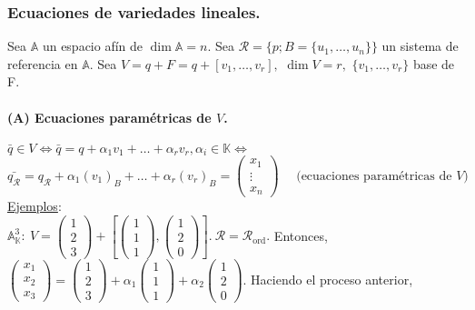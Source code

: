 \documentclass[11pt]{article}
\newcommand{\af}{\mathbb{A}}
\newcommand{\ej}{\underline{Ejemplos}:\\}
\begin{document}
\subsubsection{Ecuaciones de variedades lineales.}
Sea $\af$ un espacio afín de $\dim\af=n$. Sea $\mathcal{R}=\{p;B=\{u_1,\ldots,u_n\}\}$ un sistema de referencia en $\af$. Sea $V=q+F=q+[v_1,\ldots,v_r],$ $\dim V=r,$ $\{v_1,\ldots,v_r\}$ base de F.
\paragraph{(A) Ecuaciones paramétricas de $V$.}
$\bar{q}\in V\iff \bar{q}=q+\alpha_1v_1+\ldots+\alpha_rv_r,\alpha_i\in\mathbb{K}\iff$
\begin{equation}
\bar{q_{\mathcal{R}}}=q_{\mathcal{R}}+\alpha_1(v_1)_B+\ldots+\alpha_r(v_r)_B=\begin{pmatrix}
x_1\\
\vdots\\
x_n
\end{pmatrix}\quad\textrm{ (ecuaciones paramétricas de }V\textrm{)}
\end{equation}
\ej $\af^3_{\mathbb{K}}:\ V=\begin{pmatrix}1\\ 2\\ 3\end{pmatrix}+\left[\begin{pmatrix}1\\ 1\\ 1\end{pmatrix},\begin{pmatrix}1\\ 2\\ 0\end{pmatrix}\right].\ \mathcal{R}=\mathcal{R}_{\textrm{ord}}.$ Entonces, $\begin{pmatrix}x_1\\ x_2\\ x_3\end{pmatrix}=\begin{pmatrix}1\\ 2\\ 3\end{pmatrix}+\alpha_1\begin{pmatrix}1\\ 1\\ 1\end{pmatrix}+\alpha_2\begin{pmatrix}1\\ 2\\ 0\end{pmatrix}.$ Haciendo el proceso anterior,
\end{document}

